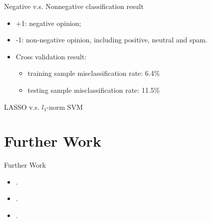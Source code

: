 \documentclass[12pt, trans]{beamer}
\newcommand{\1}[1]{{\mathbf 1}\left\{#1\right\}}        %
\begin{document}
\begin{frame}{Negative v.s. Nonnegative classification result}
\begin{itemize}[<+->]
\item +1: negative opinion;
\item -1: non-negative opinion, including positive, neutral and spam.
\item Cross validation result: 
  \begin{itemize}[<+->]
  \item training sample misclassification rate: 6.4\%
  \item testing sample misclassification rate: 11.5\%
  \end{itemize}

\end{itemize}

\end{frame}

\begin{frame}{LASSO v.s. $l_1$-norm SVM}


\end{frame}

\section{Further Work}

\begin{frame}{Further Work}

\begin{itemize}[<+->]
\item .
\end{itemize}

\end{frame}





\begin{frame}{}

\begin{itemize}[<+->]
\item  .
\end{itemize}

\end{frame}

\begin{frame}{}

\begin{itemize}[<+->]
\item  .
\end{itemize}

\end{frame}
\end{document}
